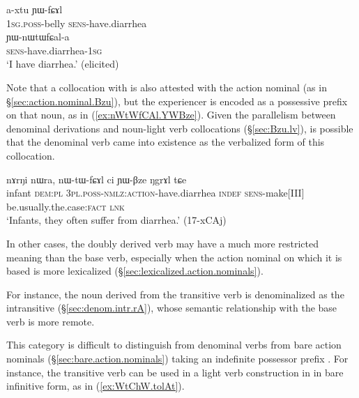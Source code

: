 \begin{exe}
\ex \label{ex:axtu.YWfCAl}
\gll a-xtu ɲɯ-fɕɤl \\
\textsc{1sg}.\textsc{poss}-belly \textsc{sens}-have.diarrhea \\
\ex \label{ex:YWnWtWfCala}
\gll ɲɯ-nɯtɯfɕal-a \\
\textsc{sens}-have.diarrhea-\textsc{1sg} \\
\glt `I have diarrhea.' (elicited)
\end{exe}

Note that a collocation with  is also attested with the action nominal  (as in §\ref{sec:action.nominal.Bzu}), but the experiencer is encoded as a possessive prefix on that noun, as  in (\ref{ex:nWtWfCAl.YWBze}). Given the parallelism between denominal derivations and noun-light verb collocations (§\ref{sec:Bzu.lv}), is possible that the denominal verb  came into existence as the verbalized form of this collocation.

\begin{exe}
\ex \label{ex:nWtWfCAl.YWBze}
\gll nɤrŋi nɯra, nɯ-tɯ-fɕɤl ci ɲɯ-βze ŋgrɤl tɕe \\
infant \textsc{dem}:\textsc{pl} \textsc{3pl}.\textsc{poss}-\textsc{nmlz}:\textsc{action}-have.diarrhea \textsc{indef} \textsc{sens}-make[III] be.usually.the.case:\textsc{fact} \textsc{lnk} \\
\glt `Infants, they often suffer from diarrhea.' (17-xCAj) 	
\end{exe}

In other cases, the doubly derived verb may have a much more restricted meaning than the base verb, especially when the action nominal on which it is based is more lexicalized (§\ref{sec:lexicalized.action.nominals}). 

For instance, the noun  derived from the transitive verb  is denominalized as the intransitive  (§\ref{sec:denom.intr.rA}), whose semantic relationship with the base verb is more remote.

This category is difficult to distinguish from denominal verbs from bare action nominals (§\ref{sec:bare.action.nominals}) taking an indefinite possessor prefix . For instance, the transitive verb  can be used in a light verb construction in  in bare infinitive form, as in (\ref{ex:WtChW.tolAt}).

